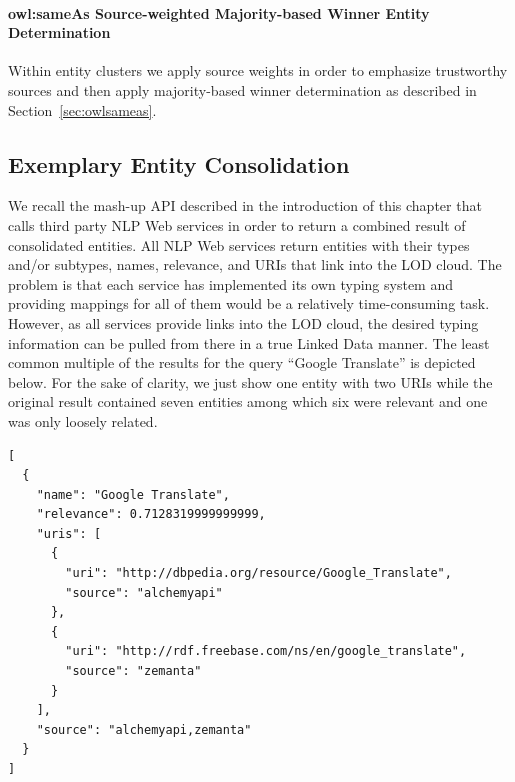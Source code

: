 \paragraph{owl:sameAs Source-weighted Majority-based Winner Entity Determination}
Within entity clusters we apply source weights in order to emphasize trustworthy sources and then apply
majority-based winner determination as described in Section~\ref{sec:owlsameas}.

\subsection{Exemplary Entity Consolidation}                     \label{sec:consolidation-nlp}
We recall the mash-up API described in the introduction of this chapter that calls third party NLP Web services in order to return a combined result of consolidated entities.
All NLP Web services return entities with their types and/or subtypes, names,
relevance, and URIs that link into the LOD cloud. The problem is that each service has implemented its own typing
system and providing mappings for all of them would be a relatively time-consuming task. However, as all services
provide links into the LOD cloud, the desired typing information can be pulled from there in a true Linked Data manner. The least common
multiple of the results for the query ``Google Translate'' is depicted below. For the sake of clarity, we just show one
entity with two URIs while the original result contained seven entities among which six were relevant and one was only loosely related.

\begin{lstlisting}
[
  {
    "name": "Google Translate",
    "relevance": 0.7128319999999999,
    "uris": [
      {
        "uri": "http://dbpedia.org/resource/Google_Translate",
        "source": "alchemyapi"
      },
      {
        "uri": "http://rdf.freebase.com/ns/en/google_translate",
        "source": "zemanta"
      }
    ],
    "source": "alchemyapi,zemanta"
  }
]
\end{lstlisting}

